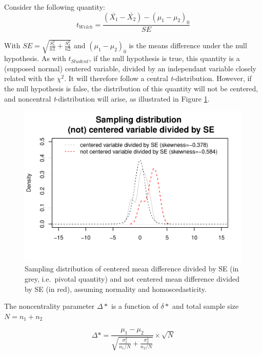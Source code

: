 \documentclass[man,floatsintext]{apa6}
\begin{document}
Consider the following quantity:
\begin{equation} 
t_{Welch}=\frac{(\bar{X_1}-\bar{X_2})-(\mu_1-\mu_2)_0}{SE}
\label{eq:plausiblelimit2}
\end{equation}

With \(SE = \sqrt{\frac{S^2_1}{n1}+\frac{S^2_2}{n2}}\) and \((\mu_1-\mu_2)_0\) is the means difference under the null hypothesis. As with \(t_{Student}\), if the null hypothesis is true, this quantity is a (supposed normal) centered variable, divided by an independant variable closely related with the \(\chi^2\). It will therefore follow a central \emph{t}-distribution. However, if the null hypothesis is false, the distribution of this quantity will not be centered, and noncentral \emph{t}-distribution will arise, as illustrated in Figure \ref{fig:SAMPLMEANDIFF4}.

\begin{figure}
\centering
\includegraphics{CI-Reminder_files/figure-latex/SAMPLMEANDIFF4-1.pdf}
\caption{\label{fig:SAMPLMEANDIFF4}Sampling distribution of centered mean difference divided by SE (in grey, i.e.~pivotal quantity) and not centered mean difference divided by SE (in red), assuming normality and homoscedasticity.}
\end{figure}

The noncentrality parameter \(\Delta*\) is a function of \(\delta*\) and total sample size \(N = n_1 + n_2\)

\begin{equation}
\Delta* = \frac{\mu_1-\mu_2}{\sqrt{\frac{\sigma_1^2}{n_1/N}+\frac{\sigma_2^2}{n_2/N}}} \times \sqrt{N}
\label{eq:ncp}
\end{equation}
\end{document}
